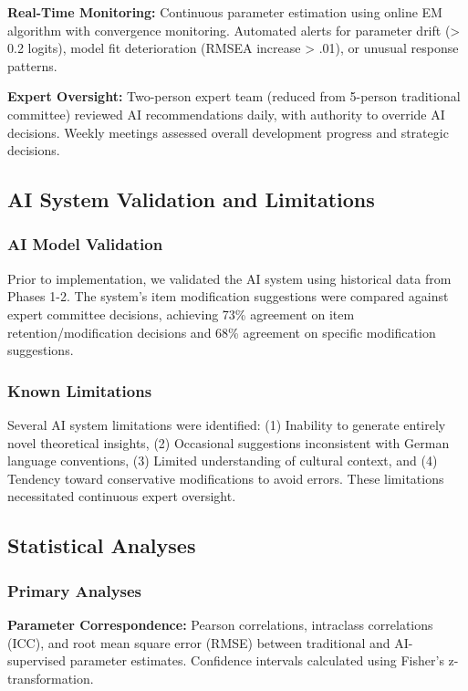 \documentclass[12pt,a4paper]{article}
\begin{document}
\textbf{Real-Time Monitoring:} Continuous parameter estimation using online EM algorithm with convergence monitoring. Automated alerts for parameter drift (> 0.2 logits), model fit deterioration (RMSEA increase > .01), or unusual response patterns.

\textbf{Expert Oversight:} Two-person expert team (reduced from 5-person traditional committee) reviewed AI recommendations daily, with authority to override AI decisions. Weekly meetings assessed overall development progress and strategic decisions.

\subsection{AI System Validation and Limitations}

\subsubsection{AI Model Validation}

Prior to implementation, we validated the AI system using historical data from Phases 1-2. The system's item modification suggestions were compared against expert committee decisions, achieving 73\% agreement on item retention/modification decisions and 68\% agreement on specific modification suggestions.

\subsubsection{Known Limitations}

Several AI system limitations were identified: (1) Inability to generate entirely novel theoretical insights, (2) Occasional suggestions inconsistent with German language conventions, (3) Limited understanding of cultural context, and (4) Tendency toward conservative modifications to avoid errors. These limitations necessitated continuous expert oversight.

\subsection{Statistical Analyses}

\subsubsection{Primary Analyses}

\textbf{Parameter Correspondence:} Pearson correlations, intraclass correlations (ICC), and root mean square error (RMSE) between traditional and AI-supervised parameter estimates. Confidence intervals calculated using Fisher's z-transformation.
\end{document}
